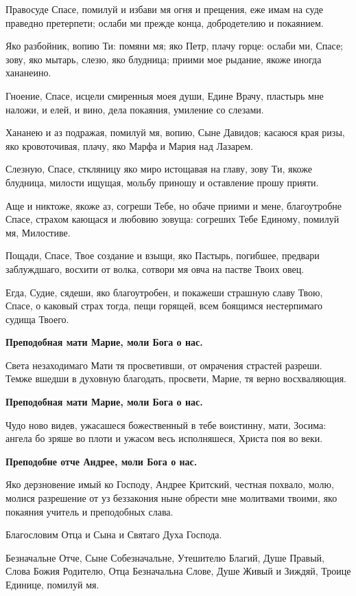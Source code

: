 Правосуде Спасе, помилуй и избави мя огня и прещения, еже имам на суде праведно претерпети; ослаби ми прежде конца, добродетелию и покаянием.


Яко разбойник, вопию Ти: помяни мя; яко Петр, плачу горце: ослаби ми, Спасе; зову, яко мытарь, слезю, яко блудница; приими мое рыдание, якоже иногда хананеино.


Гноение, Спасе, исцели смиренныя моея души, Едине Врачу, пластырь мне наложи, и елей, и вино, дела покаяния, умиление со слезами.


Хананею и аз подражая, помилуй мя, вопию, Сыне Давидов; касаюся края ризы, яко кровоточивая, плачу, яко Марфа и Мария над Лазарем.


Слезную, Спасе, сткляницу яко миро истощавая на главу, зову Ти, якоже блудница, милости ищущая, мольбу приношу и оставление прошу прияти.


Аще и никтоже, якоже аз, согреши Тебе, но обаче приими и мене, благоутробне Спасе, страхом кающася и любовию зовуща: согреших Тебе Единому, помилуй мя, Милостиве.


Пощади, Спасе, Твое создание и взыщи, яко Пастырь, погибшее, предвари заблуждшаго, восхити от волка, сотвори мя овча на пастве Твоих овец.

Егда, Судие, сядеши, яко благоутробен, и покажеши страшную славу Твою, Спасе, о каковый страх тогда, пещи горящей, всем боящимся нестерпимаго судища Твоего.


\bfseries Преподобная мати Марие, моли Бога о нас.\normalfont{}


Света незаходимаго Мати тя просветивши, от омрачения страстей разреши. Темже вшедши в духовную благодать, просвети, Марие, тя верно восхваляющия.


\bfseries Преподобная мати Марие, моли Бога о нас.\normalfont{}


Чудо ново видев, ужасашеся божественный в тебе воистинну, мати, Зосима: ангела бо зряше во плоти и ужасом весь исполняшеся, Христа поя во веки.


\bfseries Преподобне отче Андрее, моли Бога о нас.\normalfont{}


Яко дерзновение имый ко Господу, Андрее Критский, честная похвало, молю, молися разрешение от уз беззакония ныне обрести мне молитвами твоими, яко покаяния учитель и преподобных слава.


Благословим Отца и Сына и Святаго Духа Господа.

Безначальне Отче, Сыне Собезначальне, Утешителю Благий, Душе Правый, Слова Божия Родителю, Отца Безначальна Слове, Душе Живый и Зиждяй, Троице Единице, помилуй мя.


